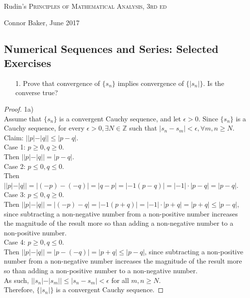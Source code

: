 \documentclass[10pt]{article}
\theoremstyle{definition}
\theoremstyle{plain}
\newcommand{\Z}{\mathbb{Z}}
\begin{document}

\begin{center}
  {\Large Rudin's \textsc{Principles of Mathematical Analysis, 3rd ed}}

  {\large Connor Baker, June 2017}

  \subsection*{Numerical Sequences and Series: Selected Exercises}
\end{center}

\begin{enumerate}
\item[1.] Prove that convergence of $\{s_n\}$ implies convergence of $\{|s_n|\}$. Is the converse true?
\end{enumerate}

\begin{proof}
1a) \\

Assume that $\{s_n\}$ is a convergent Cauchy sequence, and let $\epsilon > 0$. Since $\{s_n\}$ is a Cauchy sequence, for every $\epsilon > 0, \exists N\in\Z$ such that $|s_n-s_m|<\epsilon, \forall m,n\geq N$. \\

Claim: $||p|-|q|| \leq |p-q|.$ \\

Case 1: $p \geq 0, q\geq 0$. \\
Then $||p|-|q|| = |p - q|$. \\

Case 2: $p \leq 0, q\leq 0$. \\
Then $||p|-|q|| = |(-p) - (-q)| = |q - p| = |-1(p-q)| = |-1|\cdot|p-q| = |p-q|$. \\

Case 3: $p \leq 0, q\geq 0$. \\
Then $||p|-|q|| = |(-p) - q| =|-1(p+q)| = |-1|\cdot|p+q| = |p+q| \leq |p-q|$,  since subtracting a non-negative number from a non-positive number increases the magnitude of the result more so than adding a non-negative number to a non-positive number. \\

Case 4: $p \geq 0, q\leq 0$. \\
Then $||p|-|q|| = |p - (-q)| =|p+q| \leq |p-q|$, since subtracting a non-positive number from a non-negative number increases the magnitude of the result more so than adding a non-positive number to a non-negative number. \\


As such, $||s_n| - |s_m||\leq |s_n - s_m| < \epsilon$ for all $m,n\geq N$. \\

Therefore, $\{|s_n|\}$ is a convergent Cauchy sequence.
\end{proof}
\end{document}
